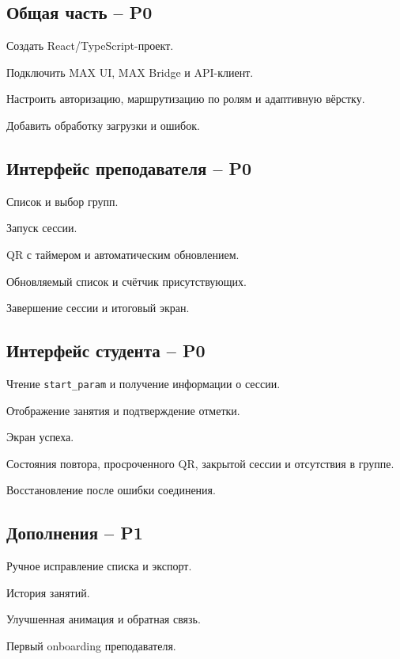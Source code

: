 \documentclass[11pt,a4paper]{article}
\newcommand{\PZero}{\textcolor{PZero}{\textbf{P0}}}
\newcommand{\POne}{\textcolor{POne}{\textbf{P1}}}
\newcommand{\code}[1]{\texttt{#1}}
\begin{document}
\subsection{Общая часть -- \PZero}
\begin{tasklist}
  \item Создать React/TypeScript-проект.
  \item Подключить MAX UI, MAX Bridge и API-клиент.
  \item Настроить авторизацию, маршрутизацию по ролям и адаптивную вёрстку.
  \item Добавить обработку загрузки и ошибок.
\end{tasklist}

\subsection{Интерфейс преподавателя -- \PZero}
\begin{tasklist}
  \item Список и выбор групп.
  \item Запуск сессии.
  \item QR с таймером и автоматическим обновлением.
  \item Обновляемый список и счётчик присутствующих.
  \item Завершение сессии и итоговый экран.
\end{tasklist}

\subsection{Интерфейс студента -- \PZero}
\begin{tasklist}
  \item Чтение \code{start\_param} и получение информации о сессии.
  \item Отображение занятия и подтверждение отметки.
  \item Экран успеха.
  \item Состояния повтора, просроченного QR, закрытой сессии и отсутствия в группе.
  \item Восстановление после ошибки соединения.
\end{tasklist}

\subsection{Дополнения -- \POne}
\begin{tasklist}
  \item Ручное исправление списка и экспорт.
  \item История занятий.
  \item Улучшенная анимация и обратная связь.
  \item Первый onboarding преподавателя.
\end{tasklist}
\end{document}
